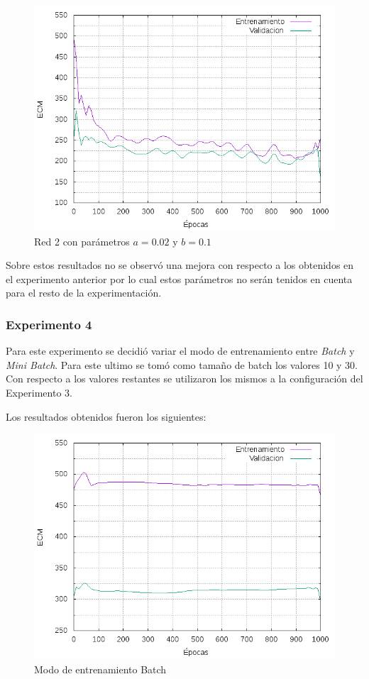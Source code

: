 \begin{figure}[H]
  \includegraphics[width=125mm]{imagenes/ej1/ex_3-2_red_11-6-6-9-1_errors.png}
  \caption{Red 2 con parámetros $a = 0.02 $ y $b = 0.1$}
\end{figure}

Sobre estos resultados no se observó una mejora con respecto a los obtenidos en el experimento anterior por lo cual estos parámetros no serán
tenidos en cuenta para el resto de la experimentación.

\subsubsection{Experimento 4}
Para este experimento se decidió variar el modo de entrenamiento entre \textit{Batch} y \textit{Mini Batch}. Para este ultimo se tomó como tamaño
de batch los valores 10 y 30. Con respecto a los valores restantes se utilizaron los mismos a la configuración del Experimento 3.

Los resultados obtenidos fueron los siguientes:

\begin{figure}[H]
  \includegraphics[width=125mm]{imagenes/ej1/ex_4-1_red_11-6-6-9-1_errors.png}
  \caption{Modo de entrenamiento Batch}
\end{figure}

